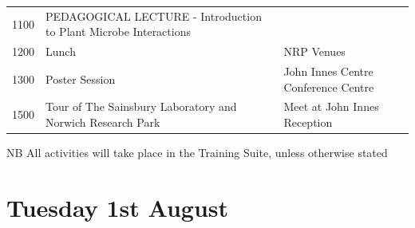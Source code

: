\documentclass[12pt,]{book}
\begin{document}
\begin{longtable}[]{@{}lll@{}}
\begin{minipage}[t]{0.09\columnwidth}
1100\strut
\end{minipage} & \begin{minipage}[t]{0.38\columnwidth}\raggedright\strut
PEDAGOGICAL LECTURE - Introduction to Plant Microbe Interactions\strut
\end{minipage} & \begin{minipage}[t]{0.38\columnwidth}\raggedright\strut
\strut
\end{minipage}\tabularnewline
\begin{minipage}[t]{0.09\columnwidth}\raggedright\strut
1200\strut
\end{minipage} & \begin{minipage}[t]{0.38\columnwidth}\raggedright\strut
Lunch\strut
\end{minipage} & \begin{minipage}[t]{0.38\columnwidth}\raggedright\strut
NRP Venues\strut
\end{minipage}\tabularnewline
\begin{minipage}[t]{0.09\columnwidth}\raggedright\strut
1300\strut
\end{minipage} & \begin{minipage}[t]{0.38\columnwidth}\raggedright\strut
Poster Session\strut
\end{minipage} & \begin{minipage}[t]{0.38\columnwidth}\raggedright\strut
John Innes Centre Conference Centre\strut
\end{minipage}\tabularnewline
\begin{minipage}[t]{0.09\columnwidth}\raggedright\strut
1500\strut
\end{minipage} & \begin{minipage}[t]{0.38\columnwidth}\raggedright\strut
Tour of The Sainsbury Laboratory and Norwich Research Park\strut
\end{minipage} & \begin{minipage}[t]{0.38\columnwidth}\raggedright\strut
Meet at John Innes Reception\strut
\end{minipage}\tabularnewline
\bottomrule
\end{longtable}

NB All activities will take place in the Training Suite, unless
otherwise stated

\section*{Tuesday 1st August}\label{tuesday-1st-august}
\end{document}
